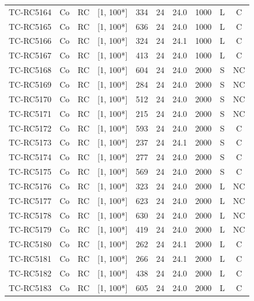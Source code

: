 \begin{longtable}{lccccccccc}
TC-RC5164 & Co & RC & [1, 100*] & 334 & 24 & 24.0 & 1000 & L & C \\
TC-RC5165 & Co & RC & [1, 100*] & 636 & 24 & 24.0 & 1000 & L & C \\
TC-RC5166 & Co & RC & [1, 100*] & 324 & 24 & 24.1 & 1000 & L & C \\
TC-RC5167 & Co & RC & [1, 100*] & 413 & 24 & 24.0 & 1000 & L & C \\
TC-RC5168 & Co & RC & [1, 100*] & 604 & 24 & 24.0 & 2000 & S & NC \\
TC-RC5169 & Co & RC & [1, 100*] & 284 & 24 & 24.0 & 2000 & S & NC \\
TC-RC5170 & Co & RC & [1, 100*] & 512 & 24 & 24.0 & 2000 & S & NC \\
TC-RC5171 & Co & RC & [1, 100*] & 215 & 24 & 24.0 & 2000 & S & NC \\
TC-RC5172 & Co & RC & [1, 100*] & 593 & 24 & 24.0 & 2000 & S & C \\
TC-RC5173 & Co & RC & [1, 100*] & 237 & 24 & 24.1 & 2000 & S & C \\
TC-RC5174 & Co & RC & [1, 100*] & 277 & 24 & 24.0 & 2000 & S & C \\
TC-RC5175 & Co & RC & [1, 100*] & 569 & 24 & 24.0 & 2000 & S & C \\
TC-RC5176 & Co & RC & [1, 100*] & 323 & 24 & 24.0 & 2000 & L & NC \\
TC-RC5177 & Co & RC & [1, 100*] & 623 & 24 & 24.0 & 2000 & L & NC \\
TC-RC5178 & Co & RC & [1, 100*] & 630 & 24 & 24.0 & 2000 & L & NC \\
TC-RC5179 & Co & RC & [1, 100*] & 419 & 24 & 24.0 & 2000 & L & NC \\
TC-RC5180 & Co & RC & [1, 100*] & 262 & 24 & 24.1 & 2000 & L & C \\
TC-RC5181 & Co & RC & [1, 100*] & 266 & 24 & 24.1 & 2000 & L & C \\
TC-RC5182 & Co & RC & [1, 100*] & 438 & 24 & 24.0 & 2000 & L & C \\
TC-RC5183 & Co & RC & [1, 100*] & 605 & 24 & 24.0 & 2000 & L & C \\
\bottomrule
\end{longtable}